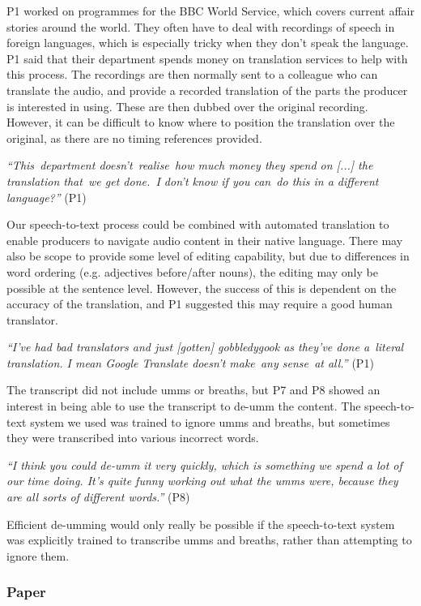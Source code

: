 P1 worked on programmes for the BBC World Service, which covers current affair stories around the world.  They often
have to deal with recordings of speech in foreign languages, which is especially tricky when they don't speak the
language. P1 said that their department spends money on translation services to help with this process. The recordings
are then normally sent to a colleague who can translate the audio, and provide a recorded translation of the parts the
producer is interested in using. These are then dubbed over the original recording. However, it can be difficult to
know where to position the translation over the original, as there are no timing references provided.

\textit{``This department doesn't realise how much money they spend on [...] the translation that we get done. I don't
know if you can do this in a different language?''} (P1)

Our speech-to-text process could be combined with automated translation to enable producers to navigate audio content
in their native language. There may also be scope to provide some level of editing capability, but due to differences
in word ordering (e.g. adjectives before/after nouns), the editing may only be possible at the sentence level. However,
the success of this is dependent on the accuracy of the translation, and P1 suggested this may require a good human
translator.

\textit{``I've had bad translators and just [gotten] gobbledygook as they've done a literal translation. I mean Google
Translate doesn't make any sense at all.''} (P1)


The transcript did not include umms or breaths, but P7 and P8 showed an interest in being able to use the transcript to
de-umm the content. The speech-to-text system we used was trained to ignore umms and breaths, but sometimes they were
transcribed into various incorrect words.

\textit{``I think you could de-umm it very quickly, which is something we spend a lot of our time doing.  It's quite
funny working out what the umms were, because they are all sorts of different words.''} (P8)

Efficient de-umming would only really be possible if the speech-to-text system was explicitly trained to transcribe
umms and breaths, rather than attempting to ignore them.

\subsubsection{Paper}

